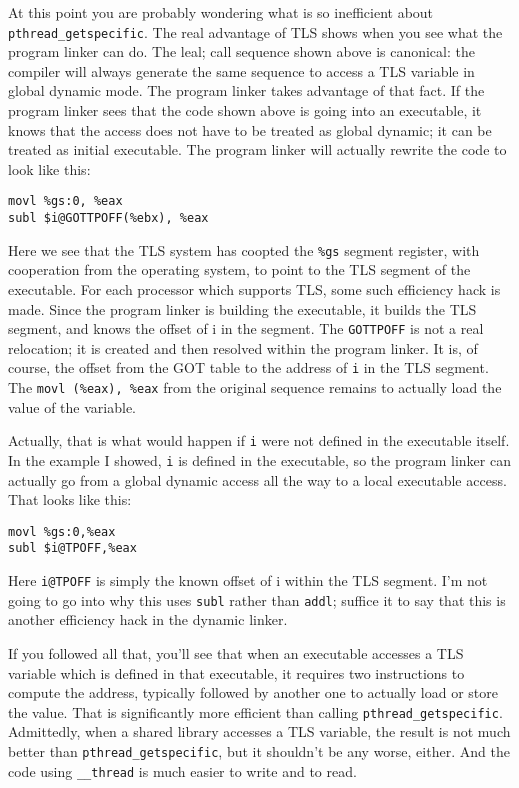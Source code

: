 At this point you are probably wondering what is so inefficient about
\texttt{pthread\_getspecific}. The real advantage of TLS shows when you
see what the program linker can do. The leal; call sequence shown above is
canonical: the compiler will always generate the same sequence to access a TLS
variable in global dynamic mode. The program linker takes advantage of that
fact. If the program linker sees that the code shown above is going into an
executable, it knows that the access does not have to be treated as global
dynamic; it can be treated as initial executable. The program linker will
actually rewrite the code to look like this:

\begin{lstlisting}
movl %gs:0, %eax
subl $i@GOTTPOFF(%ebx), %eax
\end{lstlisting}

Here we see that the TLS system has coopted the \texttt{\%gs} segment register,
with cooperation from the operating system, to point to the TLS segment of the
executable. For each processor which supports TLS, some such efficiency hack is
made. Since the program linker is building the executable, it builds the TLS
segment, and knows the offset of i in the segment. The \texttt{GOTTPOFF} is not
a real relocation; it is created and then resolved within the program linker.
It is, of course, the offset from the GOT table to the address of \texttt{i} in
the TLS segment. The \texttt{movl (\%eax), \%eax} from the original sequence
remains to actually load the value of the variable.

Actually, that is what would happen if \texttt{i} were not defined in the
executable itself. In the example I showed, \texttt{i} is defined in the
executable, so the program linker can actually go from a global dynamic access
all the way to a local executable access. That looks like this:

\begin{lstlisting}
movl %gs:0,%eax
subl $i@TPOFF,%eax
\end{lstlisting}

Here \texttt{i@TPOFF} is simply the known offset of i within the TLS segment.
I'm not going to go into why this uses \texttt{subl} rather than \texttt{addl};
suffice it to say that this is another efficiency hack in the dynamic linker.

If you followed all that, you'll see that when an executable accesses a TLS
variable which is defined in that executable, it requires two instructions
to compute the address, typically followed by another one to actually load
or store the value. That is significantly more efficient than calling
\texttt{pthread\_getspecific}. Admittedly, when a shared library accesses a TLS
variable, the result is not much better than \texttt{pthread\_getspecific}, but
it shouldn't be any worse, either. And the code using \texttt{\_\_thread} is
much easier to write and to read.

